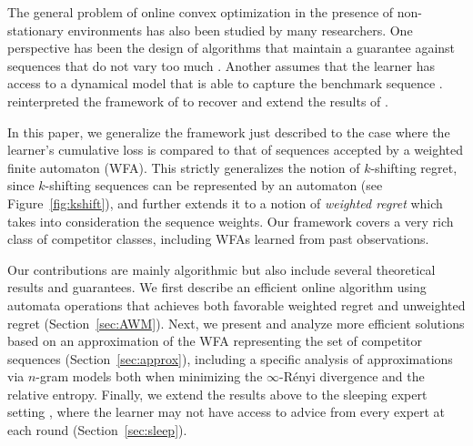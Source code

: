\documentclass{article}
\begin{document}
The general problem of online convex optimization in the presence of
non-stationary environments has also been studied by many
researchers. One perspective has been the design of algorithms that
maintain a guarantee against sequences that do not vary too much
\citep{MokhtariShahrampourJadbabaieRibeiro2016,
  ShahrampourJadbabaie2016, JadbabaieRakhlinShahrampourSridharan2015,
  BesbesGurZeevi2015}.  Another assumes that the learner has access to
a dynamical model that is able to capture the benchmark sequence
\citep{HallWillett2013}. \cite{GyorgySzepesvari2016} reinterpreted the
framework of \cite{HallWillett2013} to recover and extend the results
of \cite{HerbsterWarmuth1998}.

In this paper, we generalize the framework just described to the case
where the learner's cumulative loss is compared to that of sequences
accepted by a weighted finite automaton (WFA). This strictly
generalizes the notion of $k$-shifting regret, since $k$-shifting
sequences can be represented by an automaton (see
Figure~\ref{fig:kshift}), and further extends it to a notion of
\emph{weighted regret} which takes into consideration the sequence
weights. Our framework covers a very rich class of competitor classes,
including WFAs learned from past observations.  

Our contributions are mainly algorithmic but also include
several theoretical results and guarantees.  We first describe an
efficient online algorithm using automata operations that achieves
both favorable weighted regret and unweighted regret
(Section~\ref{sec:AWM}).  Next, we present and analyze more efficient
solutions based on an approximation of the WFA representing the set of competitor
sequences (Section~\ref{sec:approx}), including a specific analysis of
approximations via $n$-gram models both when minimizing the
$\infty$-R\'enyi divergence and the relative entropy.  Finally, we
extend the results above to the sleeping expert setting
\citep{FreundSchapireSingerWarmuth1997}, where the learner may not
have access to advice from every expert at each round
(Section~\ref{sec:sleep}).
\end{document}
